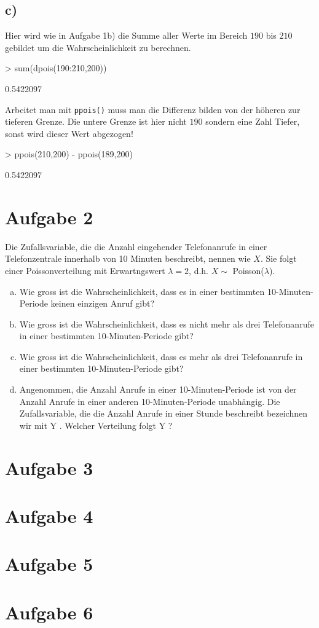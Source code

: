 \subsection*{c)}
Hier wird wie in Aufgabe 1b) die Summe aller Werte im Bereich $190$ bis $210$
gebildet um die Wahrscheinlichkeit zu berechnen.
\begin{Schunk}
\begin{Sinput}
> sum(dpois(190:210,200))
\end{Sinput}
\begin{Soutput}
[1] 0.5422097
\end{Soutput}
\end{Schunk}
Arbeitet man mit \verb!ppois()! muss man die Differenz bilden von der 
höheren zur tieferen Grenze. Die untere Grenze ist hier nicht $190$ sondern
eine Zahl Tiefer, sonst wird dieser Wert abgezogen!
\begin{Schunk}
\begin{Sinput}
> ppois(210,200) - ppois(189,200)
\end{Sinput}
\begin{Soutput}
[1] 0.5422097
\end{Soutput}
\end{Schunk}

\section{Aufgabe 2}
Die Zufallsvariable, die die Anzahl eingehender Telefonanrufe in einer 
Telefonzentrale innerhalb von 10 Minuten beschreibt, nennen wie $X$.
Sie folgt einer Poissonverteilung mit Erwartngswert $\lambda = 2$, d.h.
$X \sim$ Poisson($\lambda$).

\begin{enumerate}[(a)]
	\item Wie gross ist die Wahrscheinlichkeit, dass es in einer 
          bestimmten 10-Minuten-Periode keinen einzigen Anruf gibt?
    \item Wie gross ist die Wahrscheinlichkeit, dass es nicht mehr als drei 
          Telefonanrufe in einer bestimmten 10-Minuten-Periode gibt?
    \item Wie gross ist die Wahrscheinlichkeit, dass es mehr als drei 
          Telefonanrufe in einer bestimmten 10-Minuten-Periode gibt?
    \item Angenommen, die Anzahl Anrufe in einer 10-Minuten-Periode ist von 
          der Anzahl Anrufe in einer anderen 10-Minuten-Periode unabhängig. 
          Die Zufallsvariable, die die Anzahl Anrufe in einer Stunde 
          beschreibt bezeichnen wir mit Y . Welcher Verteilung folgt Y ?
\end{enumerate}

\section{Aufgabe 3}
\section{Aufgabe 4}
\section{Aufgabe 5}
\section{Aufgabe 6}

